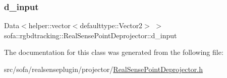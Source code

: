 \mbox{\label{classsofa_1_1rgbdtracking_1_1_real_sense_point_deprojector_a93e870b27e925201cd94f0e3c353ba94}} 
\subsubsection{\texorpdfstring{d\+\_\+input}{d\_input}}
{\footnotesize\ttfamily Data$<$helper\+::vector$<$defaulttype\+::\+Vector2$>$ $>$ sofa\+::rgbdtracking\+::\+Real\+Sense\+Point\+Deprojector\+::d\+\_\+input}



The documentation for this class was generated from the following file\+:\begin{DoxyCompactItemize}
\item 
src/sofa/realsenseplugin/projector/\hyperlink{_real_sense_point_deprojector_8h}{Real\+Sense\+Point\+Deprojector.\+h}\end{DoxyCompactItemize}
